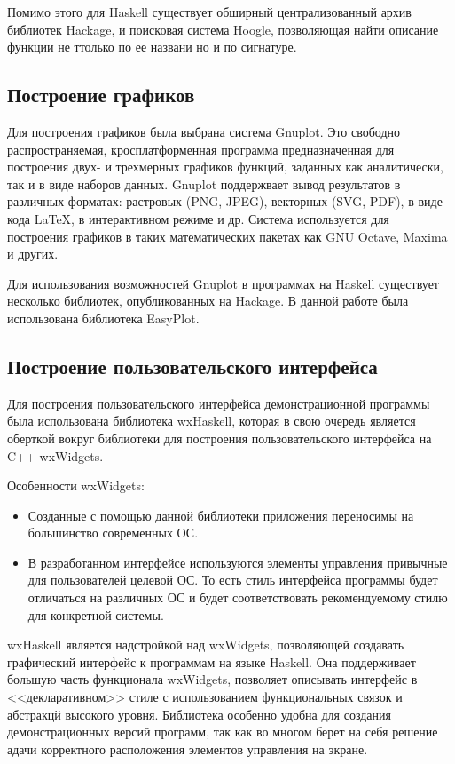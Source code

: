 Помимо этого для Haskell существует обширный централизованный архив библиотек Hackage, и поисковая система Hoogle, позволяющая найти описание функции не ттолько по ее названи но и по сигнатуре.

\subsection{Построение графиков}

Для построения графиков была выбрана система Gnuplot. Это свободно распространяемая, кросплатформенная программа предназначенная для построения двух- и трехмерных графиков функций, заданных как аналитически, так и в виде наборов данных. Gnuplot поддержвает вывод результатов в различных форматах: растровых (PNG, JPEG), векторных (SVG, PDF), в виде кода LaTeX, в интерактивном режиме и др. Система используется для построения графиков в таких математических пакетах как GNU Octave, Maxima и других.

Для использования возможностей Gnuplot в программах на Haskell существует несколько библиотек, опубликованных на Hackage. В данной работе была использована библиотека EasyPlot.


\subsection{Построение пользовательского интерфейса}

Для построения пользовательского интерфейса демонстрационной программы была использована библиотека wxHaskell, которая в свою очередь является оберткой вокруг библиотеки для построения пользовательского интерфейса на C++ wxWidgets. 

Особенности wxWidgets:

\begin{itemize}
\item Созданные с помощью данной библиотеки приложения переносимы на большинство современных ОС.

\item В разработанном интерфейсе используются элементы управления привычные для пользователей целевой ОС. То есть стиль интерфейса программы будет отличаться на различных ОС и будет соответствовать рекомендуемому стилю для конкретной системы.

\end{itemize}

wxHaskell является надстройкой над wxWidgets, позволяющей создавать графический интерфейс к программам на языке Haskell. Она поддерживает большую часть функционала wxWidgets, позволяет описывать интерфейс в <<декларативном>> стиле с использованием функциональных связок и абстракцй высокого уровня. Библиотека особенно удобна для создания демонстрационных версий программ, так как во многом берет на себя решение адачи корректного расположения элементов управления на экране. 

